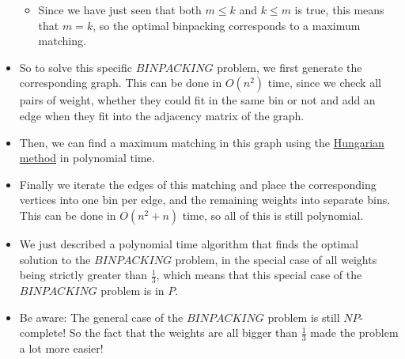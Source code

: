 \begin{itemize}
\begin{itemize}
        \item Since we have just seen that both $m\leq{}k$ and $k\leq{}m$ is true, this means that $m=k$, so the optimal binpacking corresponds to a maximum matching.
    \end{itemize}
    \item So to solve this specific $BINPACKING$ problem, we first generate the corresponding graph. This can be done in $O(n^2)$ time, since we check all pairs of weight, whether they could fit in the same bin or not and add an edge when they fit into the adjacency matrix of the graph.
    \item Then, we can find a maximum matching in this graph using the \href{https://en.wikipedia.org/wiki/Hungarian_algorithm}{Hungarian method} in polynomial time.
    \item Finally we iterate the edges of this matching and place the corresponding vertices into one bin per edge, and the remaining weights into separate bins. This can be done in $O(n^2+n)$ time, so all of this is still polynomial.
    \item We just described a polynomial time algorithm that finds the optimal solution to the $BINPACKING$ problem, in the special case of all weights being strictly greater than $\frac{1}{3}$, which means that this special case of the $BINPACKING$ problem is in $P$.
    \item Be aware: The general case of the $BINPACKING$ problem is still $NP$-complete! So the fact that the weights are all bigger than $\frac{1}{3}$ made the problem a lot more easier!
\end{itemize}